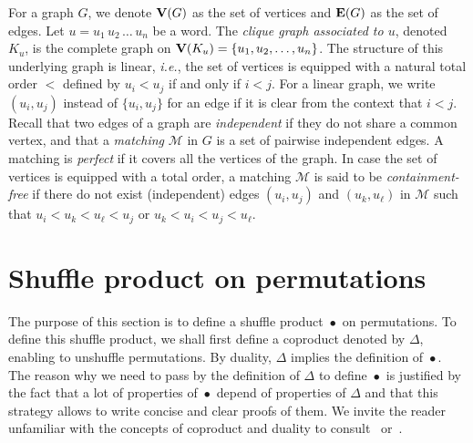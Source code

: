 \documentclass[a4paper]{llncs}
\DeclareMathOperator{\SHUFFLE}{\bullet}
\begin{document}
For a graph $G$, we denote $\mathbf{V}(G)$ as the set of vertices and
$\mathbf{E}(G)$ as the set of edges.
Let $u = u_1 \, u_2 \,\ldots\, u_n$ be a word.
The \emph{clique graph associated to $u$}, denoted $K_u$,
is the complete graph on $\mathbf{V}(K_u) = \{u_1, u_2, \ldots, u_n\}$.
The structure of this underlying graph is linear,
\emph{i.e.}, the set of vertices is equipped with a natural total order
$<$ defined by $u_i < u_j$ if and only if $i < j$.
For a linear graph, we write $(u_i, u_j)$ instead of $\{u_i, u_j\}$
for an edge if it is clear from the context that $i < j$.
Recall that two edges of a graph are \emph{independent} if they do not share
a common vertex, and that a \emph{matching} $\mathcal{M}$ in $G$ is a set of
pairwise independent edges.
A matching is \emph{perfect} if it covers all the vertices of the graph.
In case the set of vertices is equipped with a total order,
a matching $\mathcal{M}$ is said to be \emph{containment-free}
if there do not exist (independent) edges $(u_i, u_j)$ and
$(u_k, u_\ell)$ in $\mathcal{M}$ such that
$u_i < u_k < u_\ell < u_j$ or  $u_k < u_i < u_j < u_\ell$.


\section{Shuffle product on permutations}
\label{section:Shuffle product on permutations}

The purpose of this section is to define a shuffle product $\SHUFFLE$
on permutations. To define this shuffle product, we shall first define
a coproduct denoted by $\Delta$, enabling to unshuffle permutations.
By duality, $\Delta$ implies the definition of $\SHUFFLE$. The reason
why we need to pass by the definition of $\Delta$ to define $\SHUFFLE$
is justified by the fact that a lot of properties of $\SHUFFLE$ depend
of properties of $\Delta$ and that this strategy allows to write concise
and clear proofs of them. We invite the reader unfamiliar with the
concepts of coproduct and duality to consult~\cite{Joni:Rota:1979}
or~\cite{Grinberg:Reiner:2014}.
\medskip
\end{document}
